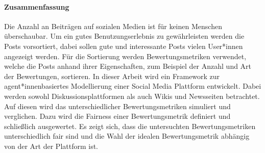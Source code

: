 	\paragraph{Zusammenfassung}
	Die Anzahl an Beiträgen auf sozialen Medien ist für keinen Menschen überschaubar. Um ein gutes Benutzungserlebnis zu gewährleisten werden die Posts vorsortiert, dabei sollen gute und interessante Posts vielen User*innen angezeigt werden. Für die Sortierung werden Bewertungsmetriken verwendet, welche die Posts anhand ihrer Eigenschaften, zum Beispiel der Anzahl und Art der Bewertungen, sortieren. In dieser Arbeit wird ein Framework zur agent*innenbasiertes Modellierung einer Social Media Plattform entwickelt. Dabei werden sowohl Diskussionsplattformen als auch Wikis und Newsseiten betrachtet. Auf diesen wird das unterschiedlicher Bewertungsmetriken simuliert und verglichen. Dazu wird die Fairness einer Bewertungsmetrik definiert und schließlich ausgewertet. Es zeigt sich, dass die untersuchten Bewertungsmetriken unterschiedlich fair sind und die Wahl der idealen Bewertungsmetrik abhängig von der Art der Plattform ist.
	
	